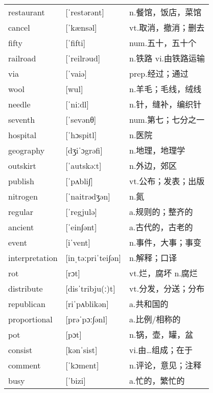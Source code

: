 \documentclass[a4paper]{article}
\begin{document}
\section{}
\begin{tabular}{l l l}

restaurant & [ˈrestərənt] & n.餐馆，饭店，菜馆 \\
cancel & [ˈkænsəl] & vt.取消，撤消；删去 \\
fifty & [ˈfifti] & num.五十，五十个 \\
railroad & [ˈreilrəud] & n.铁路 vi.由铁路运输 \\
via & [ˈvaiə] & prep.经过；通过 \\
wool & [wul] & n.羊毛；毛线，绒线 \\
needle & [ˈniːdl] & n.针，缝补，编织针 \\
seventh & [ˈsevənθ] & num.第七；七分之一 \\
hospital & [ˈhɔspitl] & n.医院 \\
geography & [dʒiˈɔgrəfi] & n.地理，地理学 \\
outskirt & [ˈautskəːt] & n.外边，郊区 \\
publish & [ˈpʌbli∫] & vt.公布；发表；出版 \\
nitrogen & [ˈnaitrədʒən] & n.氮 \\
regular & [ˈregjulə] & a.规则的；整齐的 \\
ancient & [ˈein∫ənt] & a.古代的，古老的 \\
event & [iˈvent] & n.事件，大事；事变 \\
interpretation & [inˌtəːpriˈtei∫ən] & n.解释；口译 \\
rot & [rɔt] & vt.烂，腐坏 n.腐烂 \\
distribute & [disˈtribju(ː)t] & vt.分发，分送；分布 \\
republican & [riˈpʌblikən] & a.共和国的 \\
proportional & [prəˈpɔː∫ənl] & a.比例/相称的 \\
pot & [pɔt] & n.锅，壶，罐，盆 \\
consist & [kənˈsist] & vi.由…组成；在于 \\
comment & [ˈkɔment] & n.评论，意见；注释 \\
busy & [ˈbizi] & a.忙的，繁忙的 \\

\end{tabular}
\end{document}
